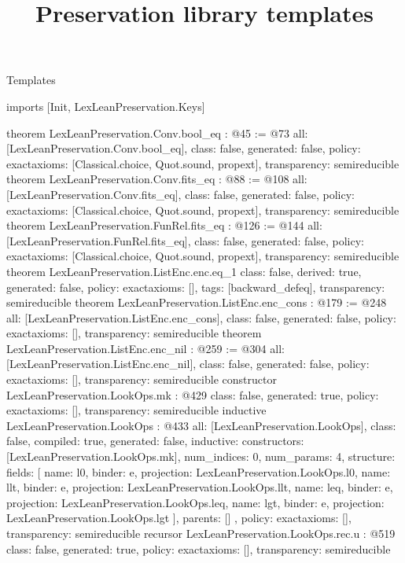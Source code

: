 \begin{lexlean}{Templates}
\title{Preservation library templates}
\begin{coremodule}
imports [Init, LexLeanPreservation.Keys]

theorem LexLeanPreservation.Conv.bool_eq : @45 := @73 {
  all: [LexLeanPreservation.Conv.bool_eq],
  class: false,
  generated: false,
  policy: exact{axioms: [Classical.choice, Quot.sound, propext]},
  transparency: semireducible
}
theorem LexLeanPreservation.Conv.fits_eq : @88 := @108 {
  all: [LexLeanPreservation.Conv.fits_eq],
  class: false,
  generated: false,
  policy: exact{axioms: [Classical.choice, Quot.sound, propext]},
  transparency: semireducible
}
theorem LexLeanPreservation.FunRel.fits_eq : @126 := @144 {
  all: [LexLeanPreservation.FunRel.fits_eq],
  class: false,
  generated: false,
  policy: exact{axioms: [Classical.choice, Quot.sound, propext]},
  transparency: semireducible
}
theorem LexLeanPreservation.ListEnc.enc.eq_1 {
  class: false,
  derived: true,
  generated: false,
  policy: exact{axioms: []},
  tags: [backward_defeq],
  transparency: semireducible
}
theorem LexLeanPreservation.ListEnc.enc_cons : @179 := @248 {
  all: [LexLeanPreservation.ListEnc.enc_cons],
  class: false,
  generated: false,
  policy: exact{axioms: []},
  transparency: semireducible
}
theorem LexLeanPreservation.ListEnc.enc_nil : @259 := @304 {
  all: [LexLeanPreservation.ListEnc.enc_nil],
  class: false,
  generated: false,
  policy: exact{axioms: []},
  transparency: semireducible
}
constructor LexLeanPreservation.LookOps.mk : @429 {
  class: false,
  generated: true,
  policy: exact{axioms: []},
  transparency: semireducible
}
inductive LexLeanPreservation.LookOps : @433 {
  all: [LexLeanPreservation.LookOps],
  class: false,
  compiled: true,
  generated: false,
  inductive: {
    constructors: [LexLeanPreservation.LookOps.mk],
    num_indices: 0,
    num_params: 4,
    structure: {
      fields: [
        {name: l0, binder: e, projection: LexLeanPreservation.LookOps.l0},
        {name: llt, binder: e, projection: LexLeanPreservation.LookOps.llt},
        {name: leq, binder: e, projection: LexLeanPreservation.LookOps.leq},
        {name: lgt, binder: e, projection: LexLeanPreservation.LookOps.lgt}
      ],
      parents: []
    }
  },
  policy: exact{axioms: []},
  transparency: semireducible
}
recursor LexLeanPreservation.LookOps.rec.{u} : @519 {
  class: false,
  generated: true,
  policy: exact{axioms: []},
  transparency: semireducible
}
\end{coremodule}
\end{lexlean}
